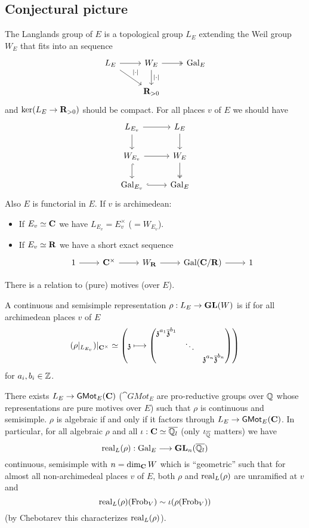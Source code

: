 \subsection{Conjectural picture}
The Langlands group of $E$ is a topological group $L_E$ extending the Weil group $W_E$
that fits into an sequence
\[
\begin{tikzcd}
L_E \ar[dr,"|\cdot |"] \ar[r] & W_E \ar[d,"|\cdot |"] \ar[r,twoheadrightarrow] & \Gal_E \\
& \R_{>0}
\end{tikzcd}
\]
and $\ker(L_E\to \R_{>0})$ should be compact. For all places $v$ of $E$ we should have
\[
\begin{tikzcd}
L_{E_v} \ar[r] \ar[d] & L_E \ar[d] \\
W_{E_v} \ar[r] \ar[d,hook] & W_E \ar[d,twoheadrightarrow] \\
\Gal_{E_v} \ar[r,hook] & \Gal_E
\end{tikzcd}
\]
Also $E$ is functorial in $E$. If $v$ is archimedean:
\begin{itemize}
\item If $E_v\simeq \mathbf{C}$ we have $L_{E_v}=E_v^{\times }$ ($=W_{E_v}$).
\item If $E_v\simeq \mathbf{R}$ we have a short exact sequence
\[
	\begin{tikzcd}
		1 \ar[r] & \C^{\times } \ar[r] & W_\R \ar[r] & \Gal(\C /\R) \ar[r] & 1
	\end{tikzcd}
\]
\end{itemize}
There is a relation to (pure) motives (over $E$).
\begin{definition}
A continuous and semisimple representation $\rho:L_E\to \GL(W)$ is  if
for all archimedean places $v$ of $E$
\[
(\rho|_{L_{E_v}})|_{\C^{\times }} \isoto \left( \kz \mapsto
	\begin{pmatrix} \kz^{a_1}\overline{\kz}^{b_1} \\ & \ddots \\ & & \kz^{a_n}\overline{\kz}^{b_n}
\end{pmatrix}  \right)
\]
for $a_i,b_i\in \mathbb Z$.
\end{definition}
\begin{conjecture}
There exists $L_E\to \cat{GMot}_E(\C)$ ($\cat{GMot}_E$ are pro-reductive groups over $\mathbb Q$
whose representations are pure motives over $E$) such that $\rho$ is continuous and
semisimple. $\rho$ is algebraic if and only if it factors through $L_E\to
\cat{GMot}_E(\C)$. In particular, for all algebraic $\rho$ and all $\iota:\mathbf{C}\simeq
\overline{\mathbb Q_l}$ (only $\iota_{\overline{\mathbb Q}}$ matters) we have
\[
\real_L(\rho):\Gal_E \to \GL_n(\overline{\Q_l})
\]
continuous, semisimple with $n=\dim_\mathbf{C} W$ which is ``geometric'' such that for almost all
non-archimedeal places $v$ of $E$, both $\rho$ and $\operatorname{real}_L(\rho)$ are unramified at $v$ and
\[
\operatorname{real}_L(\rho)(\operatorname{Frob}_V) \sim \iota(\rho(\operatorname{Frob}_V))
\]
(by Chebotarev this characterizes $\operatorname{real}_L(\rho)$).
\end{conjecture}


